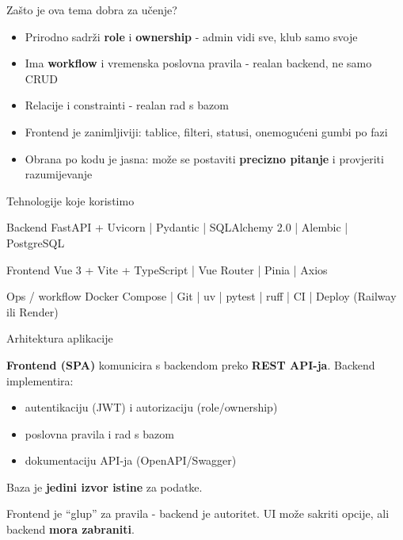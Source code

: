 \begin{frame}{Zašto je ova tema dobra za učenje?}
\begin{itemize}
  \item Prirodno sadrži \textbf{role} i \textbf{ownership} - admin vidi sve, klub samo svoje
  \item Ima \textbf{workflow} i vremenska poslovna pravila - realan backend, ne samo CRUD
  \item Relacije i constrainti - realan rad s bazom
  \item Frontend je zanimljiviji: tablice, filteri, statusi, onemogućeni gumbi po fazi
  \item Obrana po kodu je jasna: može se postaviti \textbf{precizno pitanje} i provjeriti razumijevanje
\end{itemize}
\end{frame}

\begin{frame}{Tehnologije koje koristimo}
\begin{block}{Backend}
FastAPI + Uvicorn \;|\; Pydantic \;|\; SQLAlchemy 2.0 \;|\; Alembic \;|\; PostgreSQL
\end{block}

\begin{block}{Frontend}
Vue 3 + Vite + TypeScript \;|\; Vue Router \;|\; Pinia \;|\; Axios
\end{block}

\begin{block}{Ops / workflow}
Docker Compose \;|\; Git \;|\; uv \;|\; pytest \;|\; ruff \;|\; CI \;|\; Deploy (Railway ili Render)
\end{block}
\end{frame}

\begin{frame}{Arhitektura aplikacije}

\textbf{Frontend (SPA)} komunicira s backendom preko \textbf{REST API-ja}. Backend implementira:
\begin{itemize}
  \item autentikaciju (JWT) i autorizaciju (role/ownership)
  \item poslovna pravila i rad s bazom
  \item dokumentaciju API-ja (OpenAPI/Swagger)
\end{itemize}

\vspace{0.4em}
Baza je \textbf{jedini izvor istine} za podatke.

\vspace{0.4em}
Frontend je \enquote{glup} za pravila - backend je autoritet. UI može sakriti opcije, ali backend \textbf{mora zabraniti}.
\end{frame}

